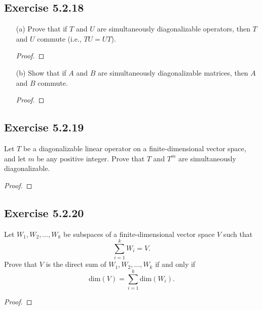 \subsection*{Exercise 5.2.18} 
\begin{enumerate}
    \item[(a)] Prove that if \( T  \) and \( U  \) are simultaneously diagonalizable operators, then \( T  \) and \( U  \) commute (i.e., \( TU = UT \)). 
        \begin{proof}
        
        \end{proof}
    \item[(b)] Show that if \( A  \) and \( B  \) are simultaneously diagonalizable matrices, then \( A  \) and \( B  \) commute.
        \begin{proof}
        
        \end{proof}
\end{enumerate}

\subsection*{Exercise 5.2.19} Let \( T  \) be a diagonalizable linear operator on a finite-dimensional vector space, and let \( m  \) be any positive integer. Prove that \( T  \) and \( T^{m} \) are simultaneously diagonalizable.
\begin{proof}

\end{proof}

\subsection*{Exercise 5.2.20} Let \( {W}_{1}, {W}_{2}, \dots, {W}_{k} \) be subspaces of a finite-dimensional vector space \( V  \) such that 
\[  \sum_{ i=1 }^{ k  } {W}_{i} = V. \]
Prove that \( V  \) is the direct sum of \( {W}_{1}, {W}_{2}, \dots, {W}_{k} \) if and only if 
\[  \text{dim}(V) = \sum_{ i=1 }^{ k } \text{dim}({W}_{i}). \]
\begin{proof}

\end{proof}


